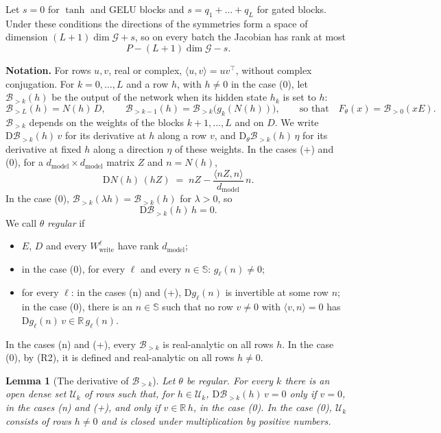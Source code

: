 \documentclass[10pt]{article}
\newtheorem{lemma}[theorem]{Lemma}
\theoremstyle{definition}
\theoremstyle{remark}
\newcommand{\R}{\mathbb{R}}
\newcommand{\Wwrite}{W_{\mathrm{write}}}
\newcommand{\dm}{d_{\mathrm{model}}}
\newcommand{\Der}{\mathrm{D}}
\newcommand{\G}{\mathcal{G}}
\newcommand{\para}[1]{\smallskip\noindent\textbf{#1}\hspace{0.5em}}
\begin{document}
Let $s = 0$ for $\tanh$ and GELU blocks and $s = q_1 + \dots + q_L$ for gated blocks. Under these conditions the directions of the symmetries form a space of dimension $(L+1)\dim\G + s$, so on every batch the Jacobian has rank at most
\begin{equation}\label{eq:e0upper}
P - (L+1)\dim\G - s .
\end{equation}

\para{Notation.} For rows $u, v$, real or complex, $\langle u, v\rangle = uv^\top$, without complex conjugation. For $k = 0, \dots, L$ and a row $h$, with $h \neq 0$ in the case (0), let $\mathcal B_{>k}(h)$ be the output of the network when its hidden state $h_k$ is set to $h$:
\[
\mathcal B_{>L}(h) = N(h)\,D, \qquad \mathcal B_{>k-1}(h) = \mathcal B_{>k}\big(g_k(N(h))\big), \qquad\text{so that}\quad F_\theta(x) = \mathcal B_{>0}(xE).
\]
$\mathcal B_{>k}$ depends on the weights of the blocks $k+1, \dots, L$ and on $D$. We write $\Der\mathcal B_{>k}(h)\,v$ for its derivative at $h$ along a row $v$, and $\Der_\theta\mathcal B_{>k}(h)\,\eta$ for its derivative at fixed $h$ along a direction $\eta$ of these weights. In the cases (+) and (0), for a $\dm\times\dm$ matrix $Z$ and $n = N(h)$,
\begin{equation}\label{eq:sbDN}
\Der N(h)\,(hZ) \;=\; nZ - \frac{\langle nZ, n\rangle}{\dm}\,n .
\end{equation}
In the case (0), $\mathcal B_{>k}(\lambda h) = \mathcal B_{>k}(h)$ for $\lambda > 0$, so
\begin{equation}\label{eq:e0radial}
\Der\mathcal B_{>k}(h)\,h = 0 .
\end{equation}
We call $\theta$ \emph{regular} if
\begin{itemize}[leftmargin=2.9em]
\item[(R1)] $E$, $D$ and every $\Wwrite^{\ell}$ have rank $\dm$;
\item[(R2)] in the case (0), for every $\ell$ and every $n \in \mathbb S$: $g_\ell(n) \neq 0$;
\item[(R3)] for every $\ell$: in the cases (n) and (+), $\Der g_\ell(n)$ is invertible at some row $n$; in the case (0), there is an $n \in \mathbb S$ such that no row $v \neq 0$ with $\langle v, n\rangle = 0$ has $\Der g_\ell(n)\,v \in \R\,g_\ell(n)$.
\end{itemize}
In the cases (n) and (+), every $\mathcal B_{>k}$ is real-analytic on all rows $h$. In the case (0), by (R2), it is defined and real-analytic on all rows $h \neq 0$.

\begin{lemma}[The derivative of $\mathcal B_{>k}$]\label{lem:e0tailrank}
Let $\theta$ be regular. For every $k$ there is an open dense set $\mathcal U_k$ of rows such that, for $h \in \mathcal U_k$, $\Der\mathcal B_{>k}(h)\,v = 0$ only if $v = 0$, in the cases (n) and (+), and only if $v \in \R\,h$, in the case (0). In the case (0), $\mathcal U_k$ consists of rows $h \neq 0$ and is closed under multiplication by positive numbers.
\end{lemma}
\end{document}
